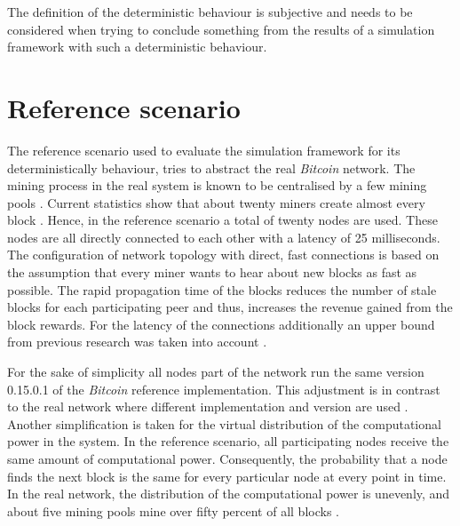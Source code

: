 The definition of the deterministic behaviour is subjective and needs to be considered when trying to conclude something from the results of a simulation framework with such a deterministic behaviour.

\section{Reference scenario}
\label{chap:reference_scenario}

The reference scenario used to evaluate the simulation framework for its deterministically behaviour, tries to abstract the real \textit{Bitcoin} network.
The mining process in the real system is known to be centralised by a few mining pools \cite{gervais2014bitcoin, beikverdi2015trend, tschorsch2016bitcoin, clarkresearch}.
Current statistics show that about twenty miners create almost every block \cite{blockchaininfopools, coindanceblocks, bitcointickerpools}.
Hence, in the reference scenario a total of twenty nodes are used.
These nodes are all directly connected to each other with a latency of 25 milliseconds.
The configuration of network topology with direct, fast connections is based on the assumption that every miner wants to hear about new blocks as fast as possible.
The rapid propagation time of the blocks reduces the number of stale blocks for each participating peer and thus, increases the revenue gained from the block rewards.
For the latency of the connections additionally an upper bound from previous research was taken into account \cite{decker2013information}.

For the sake of simplicity all nodes part of the network run the same version 0.15.0.1 \cite{bitcoin15} of the \textit{Bitcoin} reference implementation.
This adjustment is in contrast to the real network where different implementation and version are used \cite{coindancenodes}.
Another simplification is taken for the virtual distribution of the computational power in the system.
In the reference scenario, all participating nodes  receive the same amount of computational power.
Consequently, the probability that a node finds the next block is the same for every particular node at every point in time.
In the real network, the distribution of the computational power is unevenly, and about five mining pools mine over fifty percent of all blocks \cite{gervais2014bitcoin, blockchaininfopools, coindanceblocks, bitcointickerpools}. 


